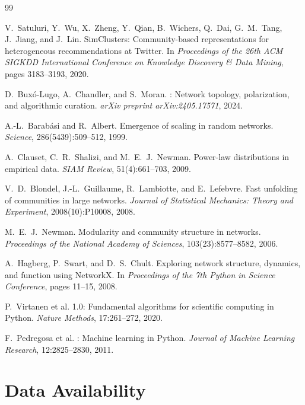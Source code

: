 \documentclass[11pt,a4paper]{article}
\begin{document}

\begin{thebibliography}{99}

V.~Satuluri, Y.~Wu, X.~Zheng, Y.~Qian, B.~Wichers, Q.~Dai, G.~M.~Tang, J.~Jiang, and J.~Lin.
\newblock SimClusters: Community-based representations for heterogeneous recommendations at {Twitter}.
\newblock In \emph{Proceedings of the 26th ACM SIGKDD International Conference on Knowledge Discovery \& Data Mining}, pages 3183--3193, 2020.

D.~Buxó-Lugo, A.~Chandler, and S.~Moran.
: Network topology, polarization, and algorithmic curation.
\newblock \emph{arXiv preprint arXiv:2405.17571}, 2024.

A.-L.~Barabási and R.~Albert.
\newblock Emergence of scaling in random networks.
\newblock \emph{Science}, 286(5439):509--512, 1999.

A.~Clauset, C.~R.~Shalizi, and M.~E.~J.~Newman.
\newblock Power-law distributions in empirical data.
\newblock \emph{SIAM Review}, 51(4):661--703, 2009.

V.~D.~Blondel, J.-L.~Guillaume, R.~Lambiotte, and E.~Lefebvre.
\newblock Fast unfolding of communities in large networks.
\newblock \emph{Journal of Statistical Mechanics: Theory and Experiment}, 2008(10):P10008, 2008.

M.~E.~J.~Newman.
\newblock Modularity and community structure in networks.
\newblock \emph{Proceedings of the National Academy of Sciences}, 103(23):8577--8582, 2006.

A.~Hagberg, P.~Swart, and D.~S.~Chult.
\newblock Exploring network structure, dynamics, and function using {NetworkX}.
\newblock In \emph{Proceedings of the 7th Python in Science Conference}, pages 11--15, 2008.

P.~Virtanen et al.
 1.0: Fundamental algorithms for scientific computing in {Python}.
\newblock \emph{Nature Methods}, 17:261--272, 2020.

F.~Pedregosa et al.
: Machine learning in {Python}.
\newblock \emph{Journal of Machine Learning Research}, 12:2825--2830, 2011.

\end{thebibliography}

\section*{Data Availability}
\end{document}
